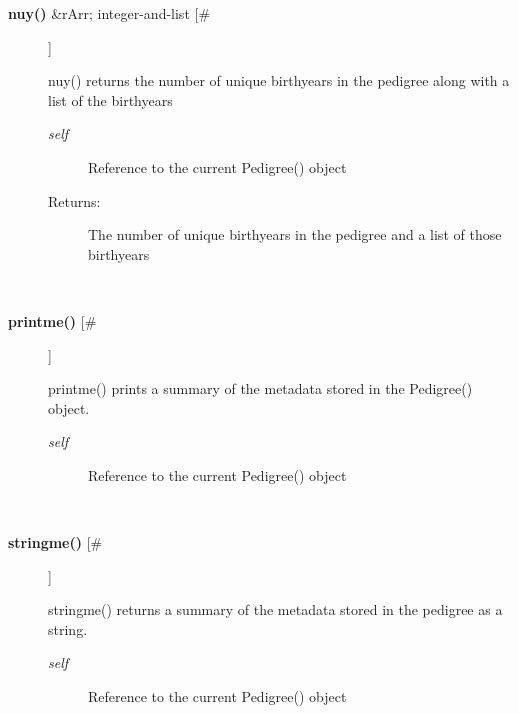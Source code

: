 \documentclass[10pt]{article}
\begin{document}
\begin{description}
\item[\textbf{nuy()}
 \&rArr; integer-and-list [\#]]

 nuy() returns the number of unique birthyears in the pedigree along with a list of the birthyears
\begin{description}
\item[\emph{self}
] Reference to the current Pedigree() object
\item[Returns:] The number of unique birthyears in the pedigree and a list of those birthyears

\end{description}
\\ 

\item[\textbf{printme()}
 [\#]]

 printme() prints a summary of the metadata stored in the Pedigree() object.
\begin{description}
\item[\emph{self}
] Reference to the current Pedigree() object

\end{description}
\\ 

\item[\textbf{stringme()}
 [\#]]

 stringme() returns a summary of the metadata stored in the pedigree as a string.
\begin{description}
\item[\emph{self}
] Reference to the current Pedigree() object

\end{description}
\\ 


\end{description}
\end{document}

